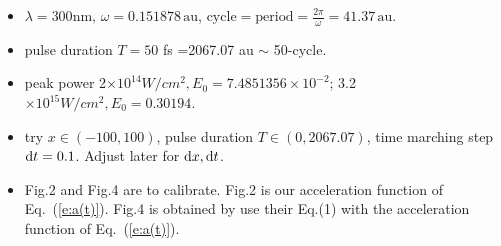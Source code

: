 \documentclass{isildur}
\begin{document}
\begin{itemize}

  \item $\lambda=300\mathrm{nm}, \,\omega=0.151878 \,\mathrm{au}$,
  $\mathrm{cycle} = \mathrm{period} = \frac{2\pi}{\omega} = 41.37
  \,\mathrm{au}$.

  \item pulse duration $T=50$ fs =2067.07 au $\sim$ 50-cycle.

  \item peak power 2$\times 10^{14}W/cm^2, E_0=7.4851356\times 10^{-2}$;
  3.2$\times 10^{15}W/cm^2, E_0=0.30194$.

  \item try $x\in (-100,100)$, pulse duration  $T \in (0,2067.07)$, time
  marching step $\mathop{}\!\mathrm{d} t=0.1$.  Adjust later for $\mathop{}\!\mathrm{d} x, \mathop{}\!\mathrm{d} t$.

  \item Fig.2 and Fig.4 are to calibrate.  Fig.2 is our acceleration function
  of Eq.~(\ref{e:a(t)}).  Fig.4 is obtained by use their Eq.(1) with the
  acceleration function of Eq.~(\ref{e:a(t)}).
  

\end{itemize}
\end{document}
